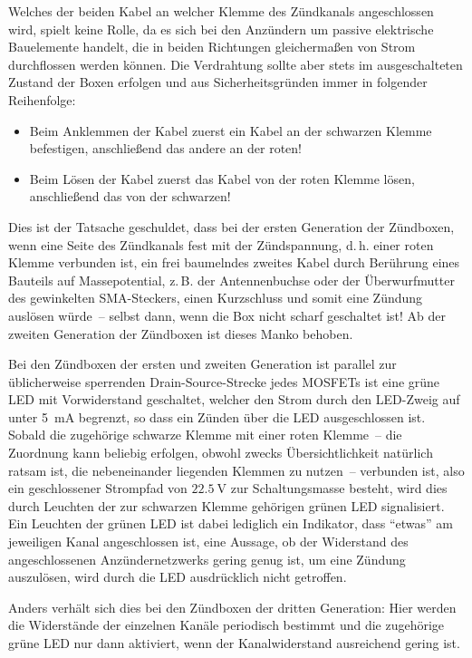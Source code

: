 \documentclass[paper=a4, parskip, numbers=noenddot, toc=listof, headsepline]{scrbook}
\begin{document}
			Welches der beiden Kabel an welcher Klemme des Zündkanals angeschlossen wird, spielt keine Rolle, da es sich bei den Anzündern um passive elektrische Bauelemente handelt, die in beiden Richtungen gleichermaßen von Strom durchflossen werden können. Die Verdrahtung sollte aber stets im ausgeschalteten Zustand der Boxen erfolgen und aus Sicherheitsgründen immer in folgender Reihenfolge:
			\begin{itemize}
				\item
				      Beim Anklemmen der Kabel zuerst ein Kabel an der schwarzen Klemme befestigen, anschließend das andere an der roten!
				\item
				      Beim Lösen der Kabel zuerst das Kabel von der roten Klemme lösen, anschließend das von der schwarzen!
			\end{itemize}
			Dies ist der Tatsache geschuldet, dass bei der ersten Generation der Zündboxen, wenn eine Seite des Zündkanals fest mit der Zündspannung, d.\,h. einer roten Klemme verbunden ist, ein frei baumelndes zweites Kabel durch Berührung eines Bauteils auf Massepotential, z.\,B. der Antennenbuchse oder der Überwurfmutter des gewinkelten SMA-Steckers, einen Kurzschluss und somit eine Zündung auslösen würde~-- selbst dann, wenn die Box nicht scharf geschaltet ist! Ab der zweiten Generation der Zündboxen ist dieses Manko behoben.

			Bei den Zündboxen der ersten und zweiten Generation ist parallel zur üblicherweise sperrenden Drain-Source-Strecke jedes MOSFETs ist eine grüne LED mit Vorwiderstand geschaltet, welcher den Strom durch den LED-Zweig auf unter \SI{5}{\milli\ampere} begrenzt, so dass ein Zünden über die LED ausgeschlossen ist. Sobald die zugehörige schwarze Klemme mit einer roten Klemme~-- die Zuordnung kann beliebig erfolgen, obwohl zwecks Übersichtlichkeit natürlich ratsam ist, die nebeneinander liegenden Klemmen zu nutzen~-- verbunden ist, also ein geschlossener Strompfad von $\SI{22,5}{\volt}$ zur Schaltungsmasse besteht, wird dies durch Leuchten der zur schwarzen Klemme gehörigen grünen LED signalisiert. Ein Leuchten der grünen LED ist dabei lediglich ein Indikator, dass \enquote{etwas} am jeweiligen Kanal angeschlossen ist, eine Aussage, ob der Widerstand des angeschlossenen Anzündernetzwerks gering genug ist, um eine Zündung auszulösen, wird durch die LED ausdrücklich nicht getroffen.
			
			Anders verhält sich dies bei den Zündboxen der dritten Generation: Hier werden die Widerstände der einzelnen Kanäle periodisch bestimmt und die zugehörige grüne LED nur dann aktiviert, wenn der Kanalwiderstand ausreichend gering ist.
\end{document}
